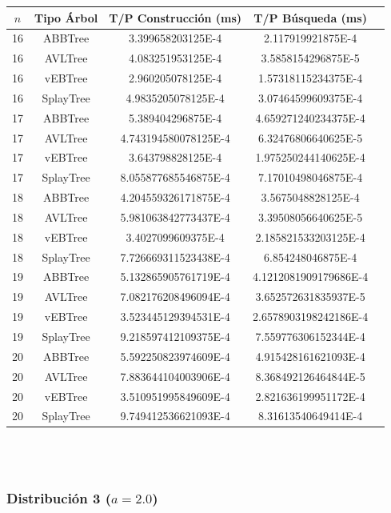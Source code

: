 \documentclass[letterpaper,12pt]{article}
\begin{document}
\begin{tabular}{|c|c|c|c|c|}
\hline
\textbf{$n$} & \textbf{Tipo Árbol} & \textbf{T/P Construcción (ms)} & \textbf{T/P Búsqueda (ms)} \\
\hline
16 & ABBTree & 3.399658203125E-4 & 2.117919921875E-4 \\
\hline
16 & AVLTree & 4.083251953125E-4  & 3.5858154296875E-5 \\
\hline
16 & vEBTree & 2.960205078125E-4  & 1.57318115234375E-4 \\
\hline
16 & SplayTree & 4.9835205078125E-4 & 3.07464599609375E-4 \\
\hline
\hline
17 & ABBTree & 5.389404296875E-4  & 4.659271240234375E-4 \\
\hline
17 & AVLTree & 4.743194580078125E-4 & 6.32476806640625E-5 \\
\hline
17 & vEBTree & 3.643798828125E-4  & 1.975250244140625E-4\\
\hline
17 & SplayTree & 8.055877685546875E-4 & 7.17010498046875E-4 \\
\hline
\hline
18 & ABBTree & 4.204559326171875E-4 & 3.5675048828125E-4 \\
\hline
18 & AVLTree & 5.981063842773437E-4 & 3.39508056640625E-5 \\
\hline
18 & vEBTree & 3.4027099609375E-4 & 2.185821533203125E-4 \\
\hline
18 & SplayTree & 7.726669311523438E-4  & 6.854248046875E-4 \\
\hline
\hline
19 & ABBTree & 5.132865905761719E-4 & 4.1212081909179686E-4 \\
\hline
19 & AVLTree & 7.082176208496094E-4  & 3.652572631835937E-5 \\
\hline
19 & vEBTree & 3.523445129394531E-4 & 2.6578903198242186E-4\\
\hline
19 & SplayTree & 9.218597412109375E-4 & 7.559776306152344E-4 \\
\hline
\hline
20 & ABBTree & 5.592250823974609E-4 & 4.915428161621093E-4 \\
\hline
20 & AVLTree & 7.883644104003906E-4 & 8.368492126464844E-5 \\
\hline
20 & vEBTree & 3.510951995849609E-4 & 2.821636199951172E-4\\
\hline
20 & SplayTree & 9.749412536621093E-4 & 8.31613540649414E-4 \\
\hline
\end{tabular}
\\ \\

\subsubsection{Distribución 3 ($a=2.0$)}
\end{document}
